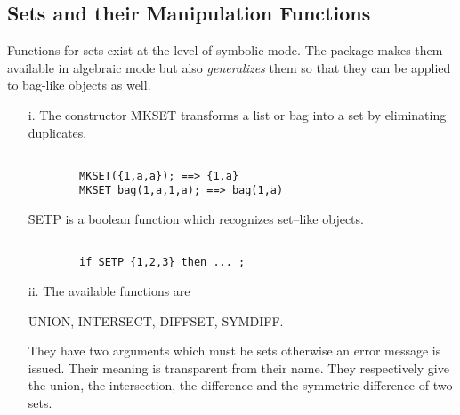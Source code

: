 \subsection{Sets and their Manipulation Functions}
Functions for sets exist at the level of symbolic mode. The
package makes them available in algebraic mode but also {\em generalizes}
them so that they can be applied to bag-like objects as well.
\begin{itemize}
\item[i.]
The constructor \f{MKSET} transforms a list or bag into a set by eliminating
duplicates.
\begin{verbatim}

        MKSET({1,a,a}); ==> {1,a}
        MKSET bag(1,a,1,a); ==> bag(1,a)

\end{verbatim}

\f{SETP} is a boolean function which recognizes set--like objects.
\begin{verbatim}

        if SETP {1,2,3} then ... ;

\end{verbatim}
\item[ii.]
The available functions are
\begin{center}
\f{UNION, INTERSECT, DIFFSET, SYMDIFF}.
\end{center}
They have two arguments which must be sets otherwise an error message
is issued.
Their meaning is transparent from their name. They respectively give the
union, the intersection, the difference and the symmetric difference of two
sets.
\end{itemize}
